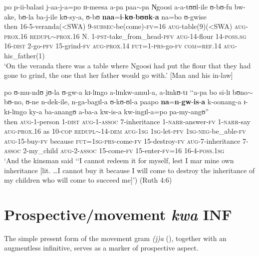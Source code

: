 \begin{exe}
\ex \label{exProclitNaaInLaw} \gll po p-ii-balasi j-aa-j-a=po ɪɪ-meesa a-pa paa$\sim$pa N̩goosi a-a-tʊʊl-ile ʊ-bʊ-fu bw-ake, bʊ-la ba-j-ile kʊ-sy-a, ʊ-bʊ \textbf{naa}=\textbf{i}-\textbf{kʊ}-\textbf{bʊʊk}-\textbf{a} na=bo ʊ-gwise\\
then 16-5-veranda(<SWA) 9-\textsc{subsec}-be(come)-\textsc{fv}=16 \textsc{aug}-table(9)(<SWA) \textsc{aug}-\textsc{prox.16} \textsc{redupl}$\sim$\textsc{prox.16} N. 1-\textsc{pst}-take\_from\_head-\textsc{pfv} \textsc{aug}-14-flour 14-\textsc{poss.sg} 16-\textsc{dist} 2-go-\textsc{pfv} 15-grind-\textsc{fv} \textsc{aug}-\textsc{prox.14} \textsc{fut}=1-\textsc{prs}-go-\textsc{fv} \textsc{com}=\textsc{ref.14} \textsc{aug}-his\_father(1)\\
\glt \lq On the veranda there was a table where Ngoosi had put the flour that they had gone to grind, the one that her father would go with.' [Man and his in-law] %

\ex \label{exProclitNaaRuth}\gll po ʊ-mu-ndʊ jʊ-la ʊ-gw-a kɪ-lɪngo a-lɪnkw-amul-a, a-lɪnkʊ-tɪ \textup{\lq\lq}a-pa bo si-lɪ bʊno$\sim$bʊ-no, ʊ-ne n-dek-ile, n-ga-bagɪl-a ʊ-kʊ-ʊl-a paapo \textbf{na}=\textbf{n}-\textbf{gw}-\textbf{is}-\textbf{a} k-oonang-a ɪ-kɪ-lɪngo ky-a ba-anangʊ a-ba-a kw-is-a kw-ingɪl-a=po pa-my-angʊ\textup{''}\\
then \textsc{aug}-1-person 1-\textsc{dist} \textsc{aug}-1-\textsc{assoc} 7-inheritance 1-\textsc{narr}-answer-\textsc{fv} 1-\textsc{narr}-say \phantom{\lq\lq}\textsc{aug}-\textsc{prox.16} as 10-\textsc{cop} \textsc{redupl}$\sim$14-\textsc{dem} \textsc{aug}-\textsc{1sg} \textsc{1sg}-let-\textsc{pfv} \textsc{1sg}-\textsc{neg}-be\_able-\textsc{fv} \textsc{aug}-15-buy-\textsc{fv} because \textsc{fut}=\textsc{1sg}-\textsc{prs}-come-\textsc{fv} 15-destroy-\textsc{fv} \textsc{aug}-7-inheritance 7-\textsc{assoc} 2-my\_child \textsc{aug}-2-\textsc{assoc} 15-come-\textsc{fv} 15-enter-\textsc{fv}=16 16-4-\textsc{poss.1sg}\\
\glt \lq And the kinsman said \lq\lq I cannot redeem it for myself, lest I mar mine own inheritance [lit. \ldots  I cannot buy it because I will come to destroy the inheritance of my children who will come to succeed me]') (Ruth 4:6)

\end{exe}

\section{Prospective/movement \textit{kwa} INF}
\label{Prospectivekwa}
The simple present form of the movement gram \textit{(j)a} (), together with an augmentless infinitive, serves as a marker of prospective aspect.

